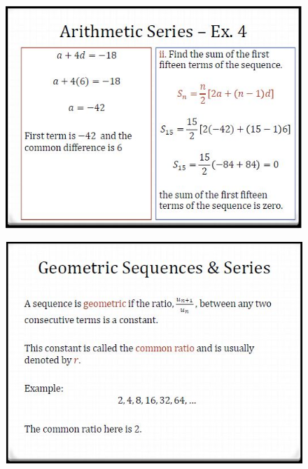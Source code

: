 \documentclass{beamer}
\begin{document}
\begin{frame}
	\begin{figure}
		\centering
		\includegraphics[width=0.99\linewidth]{SeqSer18E}
	\end{figure}
	
\end{frame}	
\begin{frame}
	\begin{figure}
		\centering
		\includegraphics[width=0.99\linewidth]{SeqSer18F}
	\end{figure}
	
\end{frame}
\end{document}
